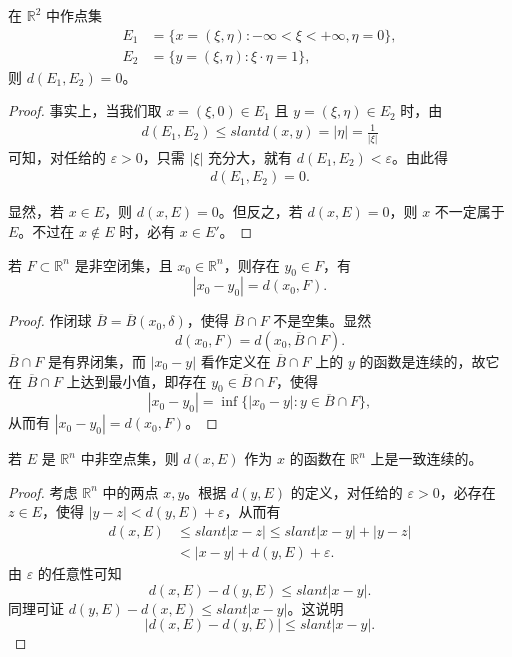\documentclass[../../main.tex]{subfiles}
\begin{document}
\begin{example}
在 \(\mathbb{R}^2\) 中作点集
\begin{align*}
E_1 &= \{x = (\xi,\eta): -\infty < \xi < +\infty, \eta = 0\},\\
E_2 &= \{y = (\xi,\eta): \xi\cdot\eta = 1\},
\end{align*}
则 \(d(E_1,E_2) = 0\)。
\end{example}
\begin{proof}
事实上，当我们取 \(x = (\xi,0)\in E_1\) 且 \(y = (\xi,\eta)\in E_2\) 时，由
\begin{align*}
d(E_1,E_2) \leqslant slant d(x,y) = |\eta| = \frac{1}{|\xi|}
\end{align*}
可知，对任给的 \(\varepsilon > 0\)，只需 \(|\xi|\) 充分大，就有 \(d(E_1,E_2) < \varepsilon\)。由此得
\begin{align*}
d(E_1,E_2) = 0.
\end{align*}

显然，若 \(x\in E\)，则 \(d(x,E) = 0\)。但反之，若 \(d(x,E) = 0\)，则 \(x\) 不一定属于 \(E\)。不过在 \(x\notin E\) 时，必有 \(x\in E'\)。 
\end{proof}

\begin{theorem}
若 \(F\subset\mathbb{R}^n\) 是非空闭集，且 \(x_0\in\mathbb{R}^n\)，则存在 \(y_0\in F\)，有
\[
|x_0 - y_0| = d(x_0,F).
\]
\end{theorem}
\begin{proof}
作闭球 \(\overline{B}=\overline{B}(x_0,\delta)\)，使得 \(\overline{B}\cap F\) 不是空集。显然
\[
d(x_0,F)=d(x_0,\overline{B}\cap F).
\]
\(\overline{B}\cap F\) 是有界闭集，而 \(|x_0 - y|\) 看作定义在 \(\overline{B}\cap F\) 上的 \(y\) 的函数是连续的，故它在 \(\overline{B}\cap F\) 上达到最小值，即存在 \(y_0\in\overline{B}\cap F\)，使得
\[
|x_0 - y_0| = \inf\{|x_0 - y|: y\in\overline{B}\cap F\},
\]
从而有 \(|x_0 - y_0| = d(x_0,F)\)。
\end{proof}

\begin{theorem}
若 \(E\) 是 \(\mathbb{R}^n\) 中非空点集，则 \(d(x,E)\) 作为 \(x\) 的函数在 \(\mathbb{R}^n\) 上是一致连续的。
\end{theorem}
\begin{proof}
考虑 \(\mathbb{R}^n\) 中的两点 \(x,y\)。根据 \(d(y,E)\) 的定义，对任给的 \(\varepsilon>0\)，必存在 \(z\in E\)，使得 \(|y - z|<d(y,E)+\varepsilon\)，从而有
\begin{align*}
d(x,E)&\leqslant slant|x - z|\leqslant slant|x - y|+|y - z|\\
&<|x - y|+d(y,E)+\varepsilon.
\end{align*}
由 \(\varepsilon\) 的任意性可知
\[
d(x,E)-d(y,E)\leqslant slant|x - y|.
\]
同理可证 \(d(y,E)-d(x,E)\leqslant slant|x - y|\)。这说明
\[
|d(x,E)-d(y,E)|\leqslant slant|x - y|.
\]
\end{proof}
\end{document}
